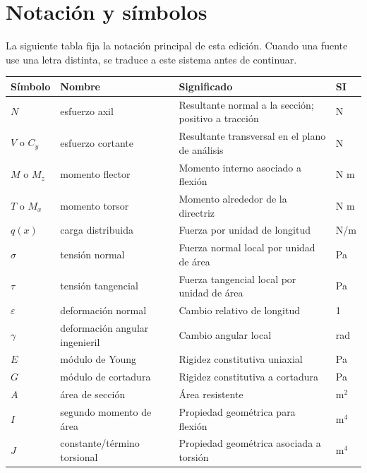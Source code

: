 \chapter{Notación y símbolos}

La siguiente tabla fija la notación principal de esta edición. Cuando una fuente use una letra distinta, se traduce a este sistema antes de continuar.

\begin{longtable}{>{\centering\arraybackslash}p{}p{}p{}p{}}
\toprule
\textbf{Símbolo} & \textbf{Nombre} & \textbf{Significado} & \textbf{SI}\\
\midrule\endhead
$N$ & esfuerzo axil & Resultante normal a la sección; positivo a tracción & N\\
$V$ o $C_y$ & esfuerzo cortante & Resultante transversal en el plano de análisis & N\\
$M$ o $M_z$ & momento flector & Momento interno asociado a flexión & N m\\
$T$ o $M_x$ & momento torsor & Momento alrededor de la directriz & N m\\
$q(x)$ & carga distribuida & Fuerza por unidad de longitud & N/m\\
$\sigma$ & tensión normal & Fuerza normal local por unidad de área & Pa\\
$\tau$ & tensión tangencial & Fuerza tangencial local por unidad de área & Pa\\
$\varepsilon$ & deformación normal & Cambio relativo de longitud & 1\\
$\gamma$ & deformación angular ingenieril & Cambio angular local & rad\\
$E$ & módulo de Young & Rigidez constitutiva uniaxial & Pa\\
$G$ & módulo de cortadura & Rigidez constitutiva a cortadura & Pa\\
$A$ & área de sección & Área resistente & m$^2$\\
$I$ & segundo momento de área & Propiedad geométrica para flexión & m$^4$\\
$J$ & constante/término torsional & Propiedad geométrica asociada a torsión & m$^4$\\
\bottomrule
\end{longtable}
